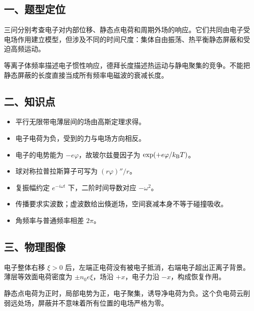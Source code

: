 \documentclass[12pt,a4paper,fontset=fandol]{ctexart}
\providecommand{\tightlist}{\setlength{\itemsep}{0pt}\setlength{\parskip}{0pt}}
\begin{document}
\subsection{一、题型定位}\label{ux4e00ux9898ux578bux5b9aux4f4d-5}

三问分别考查电子对内部位移、静态点电荷和周期外场的响应。它们共同由电子受电场作用建立模型，但涉及不同的时间尺度：集体自由振荡、热平衡静态屏蔽和受迫高频运动。

等离子体频率描述电子惯性响应，德拜长度描述热运动与静电聚集的竞争。不能把静态屏蔽的长度直接当成所有频率电磁波的衰减长度。

\subsection{二、知识点}\label{ux4e8cux77e5ux8bc6ux70b9-5}

\begin{itemize}
\tightlist
\item
  平行无限带电薄层间的场由高斯定理求得。
\item
  电子电荷为负，受到的力与电场方向相反。
\item
  电子的电势能为 \(-e\varphi\)，故玻尔兹曼因子为
  \(\exp(+e\varphi/k_{\rm B}T)\)。
\item
  球对称拉普拉斯算子可写为 \((r\varphi)''/r\)。
\item
  复振幅约定 \(e^{-i\omega t}\) 下，二阶时间导数对应 \(-\omega^2\)。
\item
  传播要求实波数；虚波数给出倏逝场，空间衰减本身不等于碰撞吸收。
\item
  角频率与普通频率相差 \(2\pi\)。
\end{itemize}

\subsection{三、物理图像}\label{ux4e09ux7269ux7406ux56feux50cf-5}

电子整体右移 \(\xi>0\)
后，左端正电荷没有被电子抵消，右端电子超出正离子背景。薄层等效面电荷密度为
\(\pm n_0e\xi\)，场沿 \(+x\)，电子力沿 \(-x\)，构成恢复作用。

静态点电荷为正时，局部电势为正，电子聚集，诱导净电荷为负。这个负电荷云削弱远处场，屏蔽并不意味着所有位置的电场严格为零。
\end{document}
